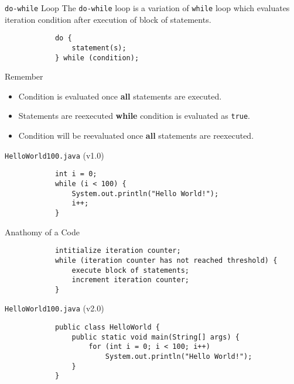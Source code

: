 \documentclass[10pt, compress]{beamer}
\begin{document}
\begin{slide}
	\begin{block}{\texttt{do-while} Loop}
		The \texttt{do-while} loop is a variation of \texttt{while} loop which evaluates iteration condition after execution of block of statements.
		\begin{verbatim}
			do {
			    statement(s);
			} while (condition);
		\end{verbatim}
	\end{block}
	\begin{block}{Remember}
		\begin{itemize}
			\item[] Condition is evaluated once \textbf{all} statements are executed.
			\item[] Statements are reexecuted \textbf{while} condition is evaluated as \texttt{true}.
			\item[] Condition will be reevaluated once \textbf{all} statements are reexecuted.
		\end{itemize}
	\end{block}
\end{slide}

\begin{slide}
	\begin{block}{\texttt{HelloWorld100.java} (v1.0)}
		\begin{verbatim}
			int i = 0;
			while (i < 100) {
			    System.out.println("Hello World!");
			    i++;
			}
		\end{verbatim}
	\end{block}
	\begin{block}{Anathomy of a Code}
		\begin{verbatim}
			intitialize iteration counter;
			while (iteration counter has not reached threshold) {
			    execute block of statements;
			    increment iteration counter;
			}
		\end{verbatim}
	\end{block}
\end{slide}

\begin{slide}
	\begin{block}{\texttt{HelloWorld100.java} (v2.0)}
		\begin{verbatim}
			public class HelloWorld {
			    public static void main(String[] args) {
			        for (int i = 0; i < 100; i++)
			            System.out.println("Hello World!");
			    }
			}
		\end{verbatim}
	\end{block}
\end{slide}
\end{document}
